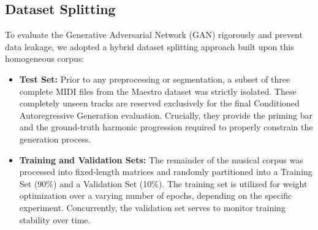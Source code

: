 \subsection{Dataset Splitting}
To evaluate the Generative Adversarial Network (GAN) rigorously and prevent data leakage, we adopted a hybrid dataset splitting approach built upon this homogeneous corpus:
\begin{itemize}
    \item \textbf{Test Set:} Prior to any preprocessing or segmentation, a subset of three complete MIDI files from the Maestro dataset was strictly isolated. These completely unseen tracks are reserved exclusively for the final Conditioned Autoregressive Generation evaluation. Crucially, they provide the priming bar and the ground-truth harmonic progression required to properly constrain the generation process.
    \item \textbf{Training and Validation Sets:} The remainder of the musical corpus was processed into fixed-length matrices and randomly partitioned into a Training Set (90$\%$) and a Validation Set (10$\%$). The training set is utilized for weight optimization over a varying number of epochs, depending on the specific experiment. Concurrently, the validation set serves to monitor training stability over time.
\end{itemize}